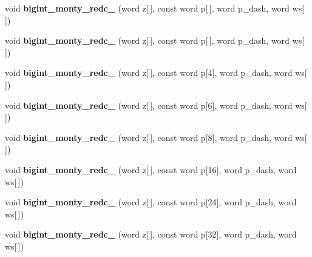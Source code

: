 \begin{DoxyCompactItemize}
\item 
\mbox{\label{namespace_botan_a8b791e811e15d36f26b423c942096ff1}} 
void {\bfseries bigint\+\_\+monty\+\_\+redc\+\_} (word z\mbox{[}$\,$\mbox{]}, const word p\mbox{[}$\,$\mbox{]}, word p\+\_\+dash, word ws\mbox{[}$\,$\mbox{]})
\item 
\mbox{\label{namespace_botan_ad12884a43301a1179180749131a26c3f}} 
void {\bfseries bigint\+\_\+monty\+\_\+redc\+\_} (word z\mbox{[}$\,$\mbox{]}, const word p\mbox{[}$\,$\mbox{]}, word p\+\_\+dash, word ws\mbox{[}$\,$\mbox{]})
\item 
\mbox{\label{namespace_botan_a078383cf9442a9cc51f7a529a94bca49}} 
void {\bfseries bigint\+\_\+monty\+\_\+redc\+\_} (word z\mbox{[}$\,$\mbox{]}, const word p\mbox{[}4\mbox{]}, word p\+\_\+dash, word ws\mbox{[}$\,$\mbox{]})
\item 
\mbox{\label{namespace_botan_a45bfaa5b64934aa73e9aaff2509d0512}} 
void {\bfseries bigint\+\_\+monty\+\_\+redc\+\_} (word z\mbox{[}$\,$\mbox{]}, const word p\mbox{[}6\mbox{]}, word p\+\_\+dash, word ws\mbox{[}$\,$\mbox{]})
\item 
\mbox{\label{namespace_botan_a7612c53942a7bee031c2f2fe62ca5c99}} 
void {\bfseries bigint\+\_\+monty\+\_\+redc\+\_} (word z\mbox{[}$\,$\mbox{]}, const word p\mbox{[}8\mbox{]}, word p\+\_\+dash, word ws\mbox{[}$\,$\mbox{]})
\item 
\mbox{\label{namespace_botan_a38f31b35e75693e061e8399d1e94648f}} 
void {\bfseries bigint\+\_\+monty\+\_\+redc\+\_} (word z\mbox{[}$\,$\mbox{]}, const word p\mbox{[}16\mbox{]}, word p\+\_\+dash, word ws\mbox{[}$\,$\mbox{]})
\item 
\mbox{\label{namespace_botan_adeff3f2c79b113b4f00866b0536356b9}} 
void {\bfseries bigint\+\_\+monty\+\_\+redc\+\_} (word z\mbox{[}$\,$\mbox{]}, const word p\mbox{[}24\mbox{]}, word p\+\_\+dash, word ws\mbox{[}$\,$\mbox{]})
\item 
\mbox{\label{namespace_botan_a07891c2173ac4966800b2869a01e7572}} 
void {\bfseries bigint\+\_\+monty\+\_\+redc\+\_} (word z\mbox{[}$\,$\mbox{]}, const word p\mbox{[}32\mbox{]}, word p\+\_\+dash, word ws\mbox{[}$\,$\mbox{]})

\end{DoxyCompactItemize}
